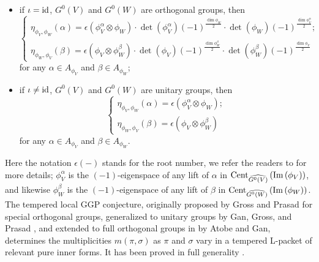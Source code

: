 \documentclass[11pt,letterpaper]{amsart}
\theoremstyle{plain}
\numberwithin{theorem}{section}
\numberwithin{equation}{subsection}
\theoremstyle{remark}
\begin{document}
\begin{itemize}
    \item if $\iota={\rm id}$, $G^0\left(V\right)$ and $G^0\left(W\right)$ are orthogonal groups, then 
    \[
        \begin{cases}
         \eta_{\phi_V,\phi_W}\left(\alpha\right) = \epsilon\left(\phi_V^\alpha\otimes\phi_W\right)\cdot \det\left(\phi_V^\alpha\right)\left(-1\right)^{\frac{\dim \phi_W}{2}}\cdot \det\left(\phi_W\right)\left(-1\right)^{\frac{\dim \phi_V^\alpha}{2}};\\
         \eta_{\phi_W,\phi_V}\left(\beta\right) = \epsilon\left(\phi_V\otimes\phi_W^\beta\right)\cdot \det\left(\phi_V\right)\left(-1\right)^{\frac{\dim \phi_W^\beta}{2}}\cdot \det\left(\phi_W^\beta\right)\left(-1\right)^{\frac{\dim \phi_V}{2}}   
        \end{cases}
    \]
    for any $\alpha\in A_{\phi_V}$ and $\beta\in A_{\phi_W}$;

    \vskip 5pt

    \item if $\iota\neq{\rm id}$, $G^0\left(V\right)$ and $G^0\left(W\right)$ are unitary groups, then 
    \[
        \begin{cases}
         \eta_{\phi_V,\phi_W}\left(\alpha\right) = \epsilon\left(\phi_V^\alpha\otimes\phi_W\right);\\
         \eta_{\phi_W,\phi_V}\left(\beta\right) = \epsilon\left(\phi_V\otimes\phi_W^\beta\right)  
        \end{cases}
    \]
    for any $\alpha\in A_{\phi_V}$ and $\beta\in A_{\phi_W}$.
\end{itemize}
\vskip 5pt
Here the notation $\epsilon\left(-\right)$ stands for the root number, we refer the readers to \cite[Sect. 5]{MR3202556} for more details; $\phi_V^\alpha$ is the $(-1)$-eigenspace of any lift of $\alpha$ in ${\rm Cent}_{\widehat{G^0(V)}}\left({\rm Im}\left(\phi_V\right)\right)$, and likewise $\phi_W^\beta$ is the $(-1)$-eigenspace of any lift of $\beta$ in ${\rm Cent}_{\widehat{G^0(W)}}\left({\rm Im}\left(\phi_W\right)\right)$. The tempered local GGP conjecture, originally proposed by Gross and Prasad \cite{MR1186476, MR1295124} for special orthogonal groups, generalized to unitary groups by Gan, Gross, and Prasad \cite{MR3202556}, and extended to full orthogonal groups in \cite[Conj. 5.2]{MR3708200} by Atobe and Gan, determines the multiplicities $m\left(\pi, \sigma\right)$ as $\pi$ and $\sigma$ vary in a tempered L-packet of relevant pure inner forms. It has been proved in full generality \cite{MR2684300, MR3155344, MR3155345, MR3202558, MR3202559, MR3155346, MR3251763, MR3676153, MR4146145, MR4568696, MR5115665, luo2020local, chenluo2022local}.
\end{document}
